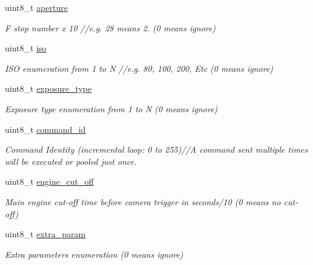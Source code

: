 \begin{DoxyCompactItemize}
uint8\+\_\+t \hyperlink{struct____mavlink__digicam__configure__t_ab5d03d83e0e818d91f35f07dca0ea867}{aperture}
\begin{DoxyCompactList}\small\item\em F stop number x 10 //e.g. 28 means 2. (0 means ignore) \end{DoxyCompactList}\item 
uint8\+\_\+t \hyperlink{struct____mavlink__digicam__configure__t_ad5ff2d4748ae87e0f8e2a1ef450562bd}{iso}
\begin{DoxyCompactList}\small\item\em I\+S\+O enumeration from 1 to N //e.g. 80, 100, 200, Etc (0 means ignore) \end{DoxyCompactList}\item 
uint8\+\_\+t \hyperlink{struct____mavlink__digicam__configure__t_ab778ab4e339c40be0ed7567dd7defe74}{exposure\+\_\+type}
\begin{DoxyCompactList}\small\item\em Exposure type enumeration from 1 to N (0 means ignore) \end{DoxyCompactList}\item 
uint8\+\_\+t \hyperlink{struct____mavlink__digicam__configure__t_a204566a1306c60b8ae2357058087ce9f}{command\+\_\+id}
\begin{DoxyCompactList}\small\item\em Command Identity (incremental loop\+: 0 to 255)//\+A command sent multiple times will be executed or pooled just once. \end{DoxyCompactList}\item 
uint8\+\_\+t \hyperlink{struct____mavlink__digicam__configure__t_a489d95fe85c951cb65ad856ee834cde4}{engine\+\_\+cut\+\_\+off}
\begin{DoxyCompactList}\small\item\em Main engine cut-\/off time before camera trigger in seconds/10 (0 means no cut-\/off) \end{DoxyCompactList}\item 
uint8\+\_\+t \hyperlink{struct____mavlink__digicam__configure__t_a044c61a1966321f1fa688b62e80e0546}{extra\+\_\+param}
\begin{DoxyCompactList}\small\item\em Extra parameters enumeration (0 means ignore) \end{DoxyCompactList}\end{DoxyCompactItemize}


